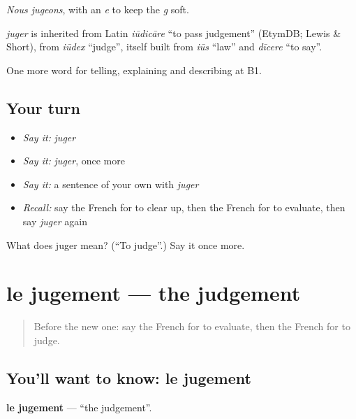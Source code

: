 \emph{Nous jugeons}, with an \emph{e} to keep the \emph{g} soft.

\begin{cousinweb}
\emph{juger} is inherited from Latin \emph{iūdicāre} \textquotedblleft{}to pass judgement\textquotedblright{} (EtymDB; Lewis \& Short), from \emph{iūdex} \textquotedblleft{}judge\textquotedblright{}, itself built from \emph{iūs} \textquotedblleft{}law\textquotedblright{} and \emph{dīcere} \textquotedblleft{}to say\textquotedblright{}.
\end{cousinweb}

\begin{grammarlens}[title={What you've built}]
One more word for telling, explaining and describing at B1.
\end{grammarlens}

\subsection*{Your turn}
\begin{itemize}
\raggedright
  \item \emph{Say it:} \emph{juger}
  \item \emph{Say it:} \emph{juger}, once more
  \item \emph{Say it:} a sentence of your own with \emph{juger}
  \item \emph{Recall:} say the French for to clear up, then the French for to evaluate, then say \emph{juger} again
\end{itemize}

\begin{tcolorbox}[breakable,colback=teal!4,colframe=teal!35!black,title={Before you move on}]
What does juger mean? (\textquotedblleft{}To judge\textquotedblright{}.) Say it once more.
\end{tcolorbox}
\section[le jugement]{le jugement — the judgement}

\label{lesson:FR-C342-jugement}



\begin{quote}
Before the new one: say the French for to evaluate, then the French for to judge.
\end{quote}

\subsection*{You'll want to know: le jugement}
\textbf{le jugement} — \textquotedblleft{}the judgement\textquotedblright{}.

